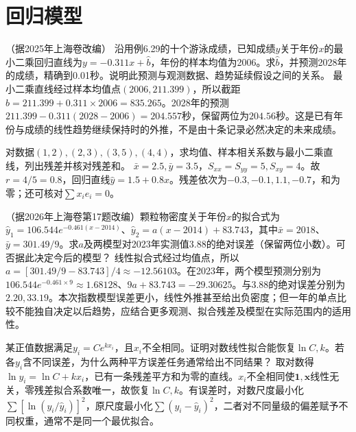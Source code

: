 \par\addvspace{12pt}

\section{回归模型}

（据2025年上海卷改编）
沿用例6.29的十个游泳成绩，已知成绩\(y\)关于年份\(x\)的最小二乘回归直线为\(y=-0.311x+\widehat b\)，年份的样本均值为2006。求\(\widehat b\)，并预测2028年的成绩，精确到0.01秒。说明此预测与观测数据、趋势延续假设之间的关系。
\solutionanswer
最小二乘直线经过样本均值点\((2006,211.399)\)，所以截距\(\widehat b=211.399+0.311\times2006=835.265\)。2028年的预测\(211.399-0.311(2028-2006)=204.557\)秒，保留两位为\(204.56\)秒。这是已有年份与成绩的线性趋势继续保持时的外推，不是由十条记录必然决定的未来成绩。


对数据\((1,2),(2,3),(3,5),(4,4)\)，求均值、样本相关系数与最小二乘直线，列出残差并核对残差和。
\solutionanswer
\(\bar x=2.5,\bar y=3.5\)，\(S_{xx}=S_{yy}=5,S_{xy}=4\)。故\(r=4/5=0.8\)，回归直线\(\widehat y=1.5+0.8x\)。残差依次为\(-0.3,-0.1,1.1,-0.7\)，和为零；还可核对\(\sum x_ie_i=0\)。


（据2026年上海卷第17题改编）颗粒物密度关于年份\(x\)的拟合式为\(\widehat y_1=106.544e^{-0.461(x-2014)}\)、\(\widehat y_2=a(x-2014)+83.743\)，其中\(\bar x=2018\)、\(\bar y=301.49/9\)。求\(a\)及两模型对2023年实测值3.88的绝对误差（保留两位小数）。可否据此决定今后的模型？
\solutionanswer
线性拟合式经过均值点，所以\(a=[301.49/9-83.743]/4\approx-12.56103\)。在2023年，两个模型预测分别为\(106.544e^{-0.461\times9}\approx1.68128\)、\(9a+83.743=-29.30625\)。与3.88的绝对误差分别为\(2.20,33.19\)。本次指数模型误差更小，线性外推甚至给出负密度；但一年的单点比较不能独自决定以后趋势，应结合更多观测、拟合残差及模型在实际范围内的适用性。


某正值数据满足\(y_i=C e^{kx_i}\)，且\(x_i\)不全相同。证明对数线性拟合能恢复\(\ln C,k\)。若各\(y_i\)含不同误差，为什么两种平方误差任务通常给出不同结果？
\solutionanswer
取对数得\(\ln y_i=\ln C+kx_i\)，已有一条残差平方和为零的直线。\(x_i\)不全相同使\(\boldsymbol1,\boldsymbol x\)线性无关，零残差拟合系数唯一，故恢复\(\ln C,k\)。有误差时，对数尺度最小化\(\sum[\ln(y_i/\widehat y_i)]^2\)，原尺度最小化\(\sum(y_i-\widehat y_i)^2\)，二者对不同量级的偏差赋予不同权重，通常不是同一个最优拟合。


